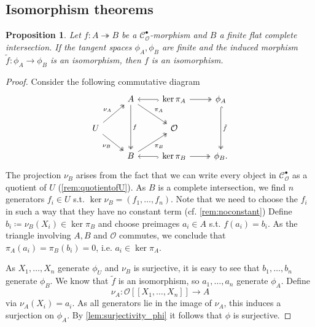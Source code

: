 \documentclass{article}
\theoremstyle{plain}%
\newtheorem{proposition}[theorem]{Proposition}
\theoremstyle{definition}
\theoremstyle{remark}
\newcommand{\cob}{\mathcal{C}_\mathcal{O}^\bullet}
\begin{document}
\subsection{Isomorphism theorems}

\begin{proposition}\cite[theorem 5.21]{Darmon1995}\label{prop:phi_iso}
    Let \(f\colon A \twoheadrightarrow B\) be a \(\cob\)-morphism and \(B\) a finite flat complete intersection.
    If the tangent spaces \(\phi_A, \phi_B\) are finite and 
    the induced morphism \(\tilde f\colon \phi_A \to \phi_B\) is an isomorphism,
    then \(f\) is an isomorphism.
\end{proposition}
\begin{proof}
    Consider the following commutative diagram
    \[
        \begin{tikzcd}
             & A \arrow[dd, "f", two heads] \arrow[rd, "\pi_A", two heads] 
             & \arrow[l, hook]\ker \pi_A \arrow[r, two heads]
             & \phi_A \arrow[dd, hook, two heads, "\tilde f"]\\
            U \arrow[ru, "\nu_A", two heads]\arrow[rd, "\nu_B"', two heads] & & \mathcal{O}&\\
             & B \arrow[ru, "\pi_B"', two heads] & \arrow[l, hook]\ker \pi_B \arrow[r, two heads] & \phi_B.
        \end{tikzcd}
    \]
    The projection \(\nu_B\) arises from the fact that we can write every object in \(\cob\)
    as a quotient of \(U\) (\cref{rem:quotientofU}).
    As \(B\) is a complete intersection, we find \(n\) generators \(f_i \in U\) s.t. \(\ker \nu_B = (f_1, \dots, f_n)\).
    Note that we need to choose the \(f_i\) in such a way that they have no constant term (cf. \cref{rem:noconstant})
    Define \(b_i \coloneqq \nu_B(X_i) \in \ker \pi_B\) and choose preimages \(a_i \in A\) s.t. \(f(a_i) = b_i\).
    As the triangle involving \(A, B\) and \(\mathcal{O}\) commutes, we conclude that \(\pi_A(a_i) = \pi_B(b_i) = 0\),
    i.e. \(a_i \in \ker \pi_A\).
    
    As \(X_1, \dots, X_n\) generate \(\phi_U\) and \(\nu_B\) is surjective, it is easy to see that 
    \(b_1, \dots, b_n\) generate \(\phi_B\).
    We know that \(\tilde f\) is an isomorphism, so \(a_1, \dots, a_n\) generate \(\phi_A\).
    Define
    \[
        \nu_A \colon \mathcal{O}[[X_1, \dots, X_n]] \to A
    \] via \(\nu_A(X_i) = a_i\).
    As all generators lie in the image of \(\nu_A\), this induces a surjection on \(\phi_A\).
    By \cref{lem:surjectivity_phi} it follows that \(\phi\) is surjective.
    

\end{proof}
\end{document}
